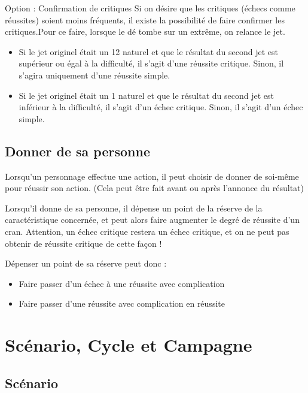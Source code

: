\documentclass[a4paper,10pt,twoside,twocolumn,openany,bg=print,justified]{dndbook}
\begin{document}
\begin{paperbox}{Option : Confirmation de critiques}
Si on désire que les critiques (échecs comme réussites) soient moins fréquents, il existe la possibilité de faire confirmer les critiques.Pour ce faire, lorsque le dé tombe sur un extrême, on relance le jet.

\begin{itemize}
\item Si le jet originel était un 12 naturel et que le résultat du second jet est supérieur ou égal à la difficulté, il s'agit d'une réussite critique. Sinon, il s'agira uniquement d'une réussite simple.
\item Si le jet originel était un 1 naturel et que le résultat du second jet est inférieur à la difficulté, il s'agit d'un échec critique. Sinon, il s'agit d'un échec simple.
\end{itemize}
\end{paperbox}

\subsection*{Donner de sa personne}

Lorsqu'un personnage effectue une action, il peut choisir de donner de soi-même pour réussir son action. (Cela peut être fait avant ou après l'annonce du résultat)

Lorsqu'il donne de sa personne, il dépense un point de la réserve de la caractéristique concernée, et peut alors faire augmenter le degré de réussite d'un cran. Attention, un échec critique restera un échec critique, et on ne peut pas obtenir de réussite critique de cette façon !

Dépenser un point de sa réserve peut donc :

\begin{itemize}
	\item Faire passer d'un échec à une réussite avec complication
	\item Faire passer d'une réussite avec complication en réussite
\end{itemize}

\section{Scénario, Cycle et Campagne}

\subsection*{Scénario}
\end{document}
